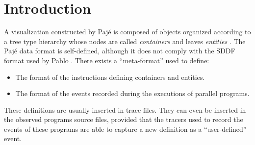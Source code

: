 %   
%
%
%


\section{Introduction}
\label{sec:traceintro}

A visualization constructed by Pajé is composed of objects organized
according to a tree type hierarchy whose nodes are called
\emph{containers} and leaves
\emph{entities}%
. The Pajé
data format is self-defined, although it does not comply with the
SDDF format used by Pablo \cite{sddf}. There exists a
``meta-format'' used to define:
\begin{itemize}
\item The format of the instructions defining containers and entities.
\item The format of the events recorded during the executions of
  parallel programs.
\end{itemize}

These definitions are usually inserted in trace files. They can even
be inserted in the observed programs source files, provided that the
tracers used to record the events of these programs are able to
capture a new definition as a ``user-defined'' event.%

